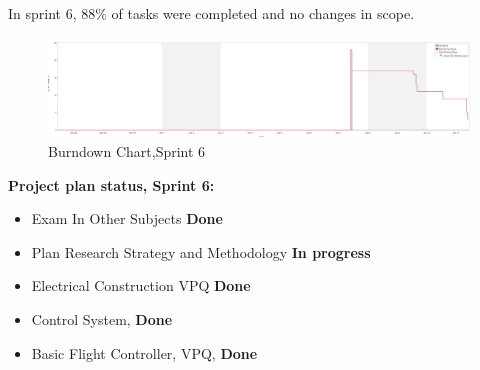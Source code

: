 In sprint 6, 88\% of tasks were completed and no changes in scope.


\begin{figure}[H]
    \centering
         \includegraphics[width = 1\textwidth]{VAPIQ-PICTURES/BDSprint6}
      \caption{Burndown Chart,Sprint 6}
    \label{fig:bd6}
\end{figure} 

\textbf{Project plan status, Sprint 6:}
\begin{itemize}
        \item Exam In Other Subjects \textbf{Done}
        \item Plan Research Strategy and Methodology \textbf{In progress}
        \item Electrical Construction VPQ \textbf{Done}
        \item Control System, \textbf{Done}
        \item Basic Flight Controller, VPQ, \textbf{Done}
    \end{itemize}





		

